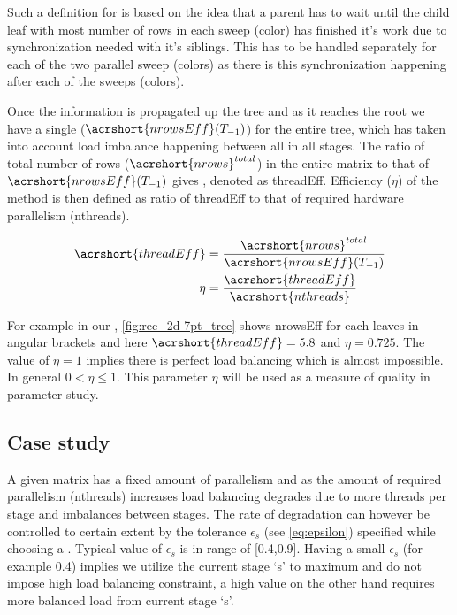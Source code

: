 Such a definition for \effRow is based on the idea that a parent has to wait until the child leaf with most number of rows in each sweep (color) has finished it's work due to synchronization needed with it's siblings. This has to be handled separately for each of the two parallel sweep (colors) as there is this synchronization happening after each of the sweeps (colors). 

Once the information is propagated up the tree and as it reaches the root we have a single \effRow ($\acrshort{nrowsEff}(T_{-1})$) for the entire tree, which has taken into account load imbalance happening between all \levelGroups in all stages. The ratio of total number of rows ($\acrshort{nrows}^{total}$) in the entire matrix to that of $\acrshort{nrowsEff}(T_{-1})$ gives \effPar, denoted as \acrshort{threadEff}. Efficiency ($\eta$) of the method is then defined as ratio of  \acrshort{threadEff} to that of required hardware parallelism (\acrshort{nthreads}). 

\begin{align}
	\acrshort{threadEff} &= \frac{\acrshort{nrows}^{total}}{\acrshort{nrowsEff}(T_{-1})} \\
	\eta &= \frac{\acrshort{threadEff}}{\acrshort{nthreads}} \label{eq:eta}
\end{align}

For example in our \stex, \cref{fig:rec_2d-7pt_tree} shows \acrshort{nrowsEff} for each leaves in angular brackets and here $\acrshort{threadEff} = 5.8$ and $\eta = 0.725$. The value of $\eta = 1$ implies there is perfect load balancing which is almost impossible. In general $0 < \eta \leq 1$. This parameter $\eta$ will be used as a measure of quality in parameter study.

\subsection{Case study}
A given matrix has a fixed amount of parallelism and as the amount of required parallelism (\acrshort{nthreads}) increases load balancing degrades due to more threads per stage and imbalances between stages. The rate of degradation can however be controlled to certain extent by the tolerance $\epsilon_s$ (see \cref{eq:epsilon}) specified while choosing a \levelGroup. Typical value of $\epsilon_s$ is in range of [0.4,0.9]. Having a small $\epsilon_s$ (for example 0.4) implies we utilize the current stage `s' to maximum and do not impose high load balancing constraint, a high value on the other hand requires more balanced load from current stage `s'. 

